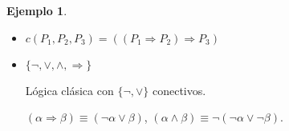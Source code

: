 \documentclass[a4paper,11pt]{article}
\theoremstyle{definition}
\newtheorem{exap}{Ejemplo}[section]
\theoremstyle{remark}
\begin{document}
\begin{exap}
\begin{itemize}
\item $c(P_1, P_2, P_3) = ((P_1 \Rightarrow P_2) \Rightarrow P_3)$
\item $\{\neg, \vee, \wedge, \Rightarrow\}$

Lógica clásica con $\{\neg, \vee\}$ conectivos.

$(\alpha \Rightarrow \beta) \equiv (\neg \alpha \vee \beta)$, 
$(\alpha \wedge \beta) \equiv \neg(\neg \alpha \vee \neg\beta)$.
\end{itemize}

\end{exap}
\end{document}
